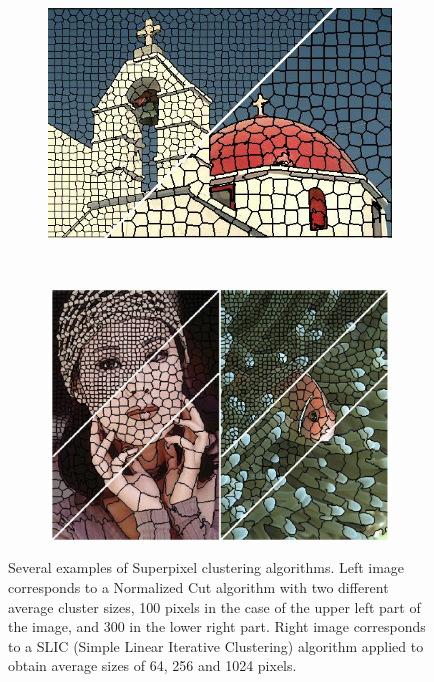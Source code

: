 \begin{figure}[htbp]
	\centering
    \begin{subfigure}[l]{0.51\textwidth}
        \centering
    	\includegraphics[width=\textwidth]
    	{figures/Superpixels-02.jpg}
    \end{subfigure}
    ~
    \begin{subfigure}[r]{0.47\textwidth}
	    \centering
   		\includegraphics[width=\textwidth]
    	{figures/Superpixels-03.png}
	\end{subfigure}
	\caption[dummy]{Several examples of Superpixel clustering algorithms. Left image \cite{mori2005guiding} corresponds to a Normalized Cut algorithm with two different average cluster sizes, 100 pixels in the case of the upper left part of the image, and 300 in the lower right part. Right image \cite{achanta2012slic}
	 corresponds to a SLIC (Simple Linear Iterative Clustering) algorithm \cite{achanta2010slic} applied to obtain average sizes of 64, 256 and 1024 pixels.}
    \label{fig:generic_superpixels}
\end{figure}

